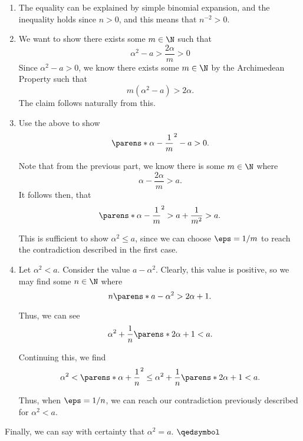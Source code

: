 \documentclass{article}
\begin{document}
\begin{enumerate}
\begin{enumerate}
        \end{enumerate}

  \item The equality can be explained by simple binomial expansion, and the inequality holds since $n > 0$, and this
        means that $n^{-2} > 0$.

  \item We want to show there exists some $m \in \N$ such that
        \begin{equation*}
          \alpha^{2} - a > \frac{2\alpha}{m} > 0
        \end{equation*}
        Since $\alpha^{2} - a > 0$, we know there exists some $m \in \N$ by the Archimedean Property
        such that
        \begin{equation*}
          m(\alpha^{2} - a) > 2\alpha.
        \end{equation*}
        The claim follows naturally from this.

  \item Use the above to show
        \begin{equation*}
          \parens*{\alpha - \frac{1}{m}}^{2} - a > 0.
        \end{equation*}

        Note that from the previous part, we know there is some $m \in \N$ where
        \begin{equation*}
          \alpha - \frac{2\alpha}{m} > a.
        \end{equation*}
        It follows then, that
        \begin{equation*}
          \parens*{\alpha - \frac{1}{m}}^{2} > a + \frac{1}{m^{2}} > a.
        \end{equation*}

        This is sufficient to show $\alpha^{2} \le a$, since we can choose $\eps = 1/m$
        to reach the contradiction described in the first case.

  \item Let $\alpha^{2} < a$.
        Consider the value $a - \alpha^{2}$. Clearly, this value is positive, so we may find some
        $n \in \N$ where
        \begin{equation*}
          n\parens*{a - \alpha^{2}} > 2\alpha + 1.
        \end{equation*}

        Thus, we can see
        \begin{equation*}
          \alpha^{2} + \frac{1}{n}\parens*{2\alpha + 1} < a.
        \end{equation*}

        Continuing this, we find
        \begin{equation*}
          \alpha^{2}
          < \parens*{\alpha + \frac{1}{n}}^{2}
          \le \alpha^{2} + \frac{1}{n}\parens*{2\alpha + 1}
          < a.
        \end{equation*}

        Thus, when $\eps = 1/n$, we can reach our contradiction previously described for $\alpha^{2} < a$.

\end{enumerate}

Finally, we can say with certainty that $\alpha^{2} = a$. $\qedsymbol$
\end{document}
